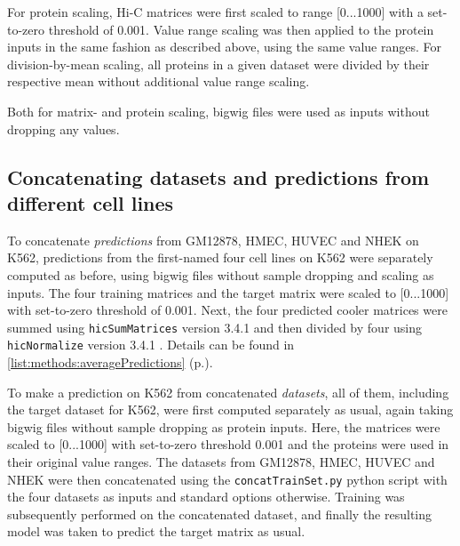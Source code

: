 For protein scaling, Hi-C matrices were first scaled to range [0...1000] with a set-to-zero threshold of 0.001.
Value range scaling was then applied to the protein inputs in the same fashion as described above, using the same value ranges.
For division-by-mean scaling, all proteins in a given dataset 
were divided by their respective mean without additional value range scaling.

Both for matrix- and protein scaling, bigwig files were used as inputs without dropping any values. 

\subsection{Concatenating datasets and predictions from different cell lines} \label{sec:methods:concatenating}
To concatenate \emph{predictions} from GM12878, HMEC, HUVEC and NHEK on K562,
predictions from the first-named four cell lines on K562 were separately computed as before, 
using bigwig files without sample dropping and scaling as inputs.
The four training matrices and the target matrix were scaled to [0...1000] with set-to-zero threshold of 0.001.
Next, the four predicted cooler matrices were summed using \texttt{hicSumMatrices} version 3.4.1
and then divided by four using \texttt{hicNormalize} version 3.4.1 \cite{Ramirez2016}.
Details can be found in \autoref{list:methods:averagePredictions} (p.\;\pageref{list:methods:averagePredictions}).

To make a prediction on K562 from concatenated \emph{datasets},
all of them, including the target dataset for K562, were first computed separately as usual, 
again taking bigwig files without sample dropping as protein inputs.
Here, the matrices were scaled to [0...1000] with set-to-zero threshold 0.001 and the proteins were used
in their original value ranges.
The datasets from GM12878, HMEC, HUVEC and NHEK were then concatenated 
using the \texttt{concatTrainSet.py} python script \cite{Krauth2020} with the four
datasets as inputs and standard options otherwise.
Training was subsequently performed on the concatenated dataset, and finally
the resulting model was taken to predict the target matrix as usual.

